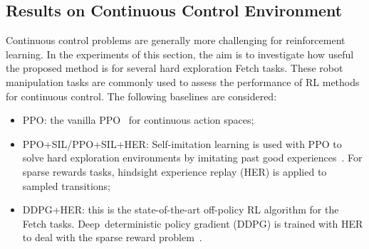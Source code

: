 \subsection{Results on Continuous Control Environment}
{Continuous control problems are generally more challenging for reinforcement learning. In the experiments of this section, the aim is to investigate how useful the proposed method is for several hard exploration Fetch tasks. These robot manipulation tasks are commonly used to assess the performance of RL methods for continuous control.} The following baselines are considered: 
\begin{itemize}
    \item PPO: the vanilla PPO~\cite{schulman2017proximal} for continuous action spaces;
    \item PPO+SIL/PPO+SIL+HER: Self-imitation learning is used with PPO to solve hard exploration environments by imitating past good experiences~\cite{oh2018self}. For sparse rewards tasks, hindsight experience replay (HER) is applied to sampled transitions;
    \item DDPG+HER: this is the state-of-the-art off-policy RL algorithm for the Fetch tasks. Deep~deterministic policy gradient (DDPG) is trained with HER to deal with the sparse reward problem~\cite{andrychowicz2017hindsight}.
\end{itemize}


